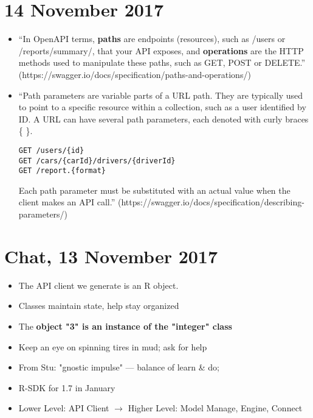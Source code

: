 \documentclass{article}
\begin{document}
\section*{14 November 2017}
\begin{itemize}
\item ``In OpenAPI terms, {\bf paths} are endpoints (resources), such as /users or /reports/summary/, that your API exposes, and {\bf operations} are the HTTP methods used to manipulate these paths, such as GET, POST or DELETE.'' (https://swagger.io/docs/specification/paths-and-operations/)
\item ``Path parameters are variable parts of a URL path. They are typically used to point to a specific resource within a collection, such as a user identified by ID. A URL can have several path parameters, each denoted with curly braces \{ \}.
\begin{verbatim}
GET /users/{id}
GET /cars/{carId}/drivers/{driverId}
GET /report.{format}
\end{verbatim}
Each path parameter must be substituted with an actual value when the client makes an API call.'' (https://swagger.io/docs/specification/describing-parameters/)
\end{itemize}

\section*{Chat, 13 November 2017}
\begin{itemize}
\item The API client we generate is an R object.
\item Classes maintain state, help stay organized
\item The {\bf object "3" is an instance of the "integer" class} 
\item Keep an eye on spinning tires in mud; ask for help
\item From Stu: "gnostic impulse" --- balance of learn \& do; 
\item R-SDK for 1.7 in January
\item Lower Level: API Client $\rightarrow$ Higher Level: Model Manage, Engine, Connect
\end{itemize}
\end{document}
